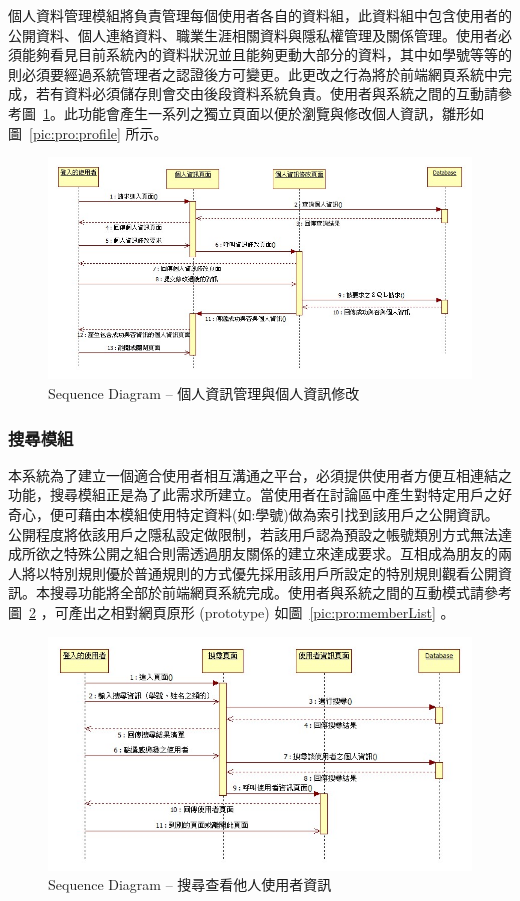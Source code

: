 個人資料管理模組將負責管理每個使用者各自的資料組，此資料組中包含使用者的公開資料、個人連絡資料、職業生涯相關資料與隱私權管理及關係管理。使用者必須能夠看見目前系統內的資料狀況並且能夠更動大部分的資料，其中如學號等等的則必須要經過系統管理者之認證後方可變更。此更改之行為將於前端網頁系統中完成，若有資料必須儲存則會交由後段資料系統負責。使用者與系統之間的互動請參考圖~\ref{pic:seq:profileMgt}。此功能會產生一系列之獨立頁面以便於瀏覽與修改個人資訊，雛形如圖~\ref{pic:pro:profile} 所示。

\begin{figure}[H]
\centering
\includegraphics[width=\textwidth]{img/useseq/stage1/seqProfileEdit.jpg}
\caption{Sequence Diagram -- 個人資訊管理與個人資訊修改}
\label{pic:seq:profileMgt}
\end{figure}

\subsubsection{搜尋模組}
本系統為了建立一個適合使用者相互溝通之平台，必須提供使用者方便互相連結之功能，搜尋模組正是為了此需求所建立。當使用者在討論區中產生對特定用戶之好奇心，便可藉由本模組使用特定資料(如:學號)做為索引找到該用戶之公開資訊。公開程度將依該用戶之隱私設定做限制，若該用戶認為預設之帳號類別方式無法達成所欲之特殊公開之組合則需透過朋友關係的建立來達成要求。互相成為朋友的兩人將以特別規則優於普通規則的方式優先採用該用戶所設定的特別規則觀看公開資訊。本搜尋功能將全部於前端網頁系統完成。使用者與系統之間的互動模式請參考圖~\ref{pic:seq:searchUser} ，可產出之相對網頁原形 (prototype) 如圖~\ref{pic:pro:memberList} 。

\begin{figure}[H]
\centering
\includegraphics[width=\textwidth]{img/useseq/stage1/seqSeqrchUser.jpg}
\caption{Sequence Diagram -- 搜尋查看他人使用者資訊}
\label{pic:seq:searchUser}
\end{figure}

